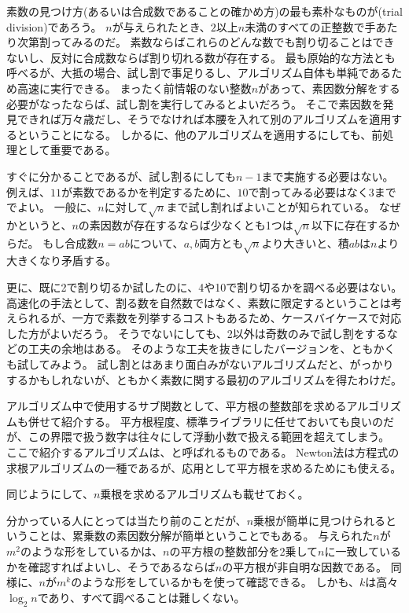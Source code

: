 素数の見つけ方(あるいは合成数であることの確かめ方)の最も素朴なものが(trial division)であろう。
$n$が与えられたとき、$2$以上$n$未満のすべての正整数で手あたり次第割ってみるのだ。
素数ならばこれらのどんな数でも割り切ることはできないし、反対に合成数ならば割り切れる数が存在する。
最も原始的な方法とも呼べるが、大抵の場合、試し割で事足りるし、アルゴリズム自体も単純であるため高速に実行できる。
まったく前情報のない整数$n$があって、素因数分解をする必要がなったならば、試し割を実行してみるとよいだろう。
そこで素因数を発見できれば万々歳だし、そうでなければ本腰を入れて別のアルゴリズムを適用するということになる。
しかるに、他のアルゴリズムを適用するにしても、前処理として重要である。

すぐに分かることであるが、試し割るにしても$n-1$まで実施する必要はない。
例えば、$11$が素数であるかを判定するために、$10$で割ってみる必要はなく$3$まででよい。
一般に、$n$に対して$\sqrt{n}$まで試し割ればよいことが知られている。
なぜかというと、$n$の素因数が存在するならば少なくとも1つは$\sqrt{n}$以下に存在するからだ。
もし合成数$n=ab$について、$a,b$両方とも$\sqrt{n}$より大きいと、積$ab$は$n$より大きくなり矛盾する。

更に、既に2で割り切るか試したのに、4や10で割り切るかを調べる必要はない。
高速化の手法として、割る数を自然数ではなく、素数に限定するということは考えられるが、一方で素数を列挙するコストもあるため、ケースバイケースで対応した方がよいだろう。
そうでないにしても、2以外は奇数のみで試し割をするなどの工夫の余地はある。
そのような工夫を抜きにしたバージョンを、ともかくも試してみよう。
試し割とはあまり面白みがないアルゴリズムだと、がっかりするかもしれないが、ともかく素数に関する最初のアルゴリズムを得たわけだ。


アルゴリズム中で使用するサブ関数として、平方根の整数部を求めるアルゴリズムも併せて紹介する。
平方根程度、標準ライブラリに任せておいても良いのだが、この界隈で扱う数字は往々にして浮動小数で扱える範囲を超えてしまう。
ここで紹介するアルゴリズムは、と呼ばれるものである。
Newton法は方程式の求根アルゴリズムの一種であるが、応用として平方根を求めるためにも使える。


同じようにして、$n$乗根を求めるアルゴリズムも載せておく。


分かっている人にとっては当たり前のことだが、$n$乗根が簡単に見つけられるということは、累乗数の素因数分解が簡単ということでもある。
与えられた$n$が$m^2$のような形をしているかは、$n$の平方根の整数部分を2乗して$n$に一致しているかを確認すればよいし、そうであるならば$n$の平方根が非自明な因数である。
同様に、$n$が$m^k$のような形をしているかもを使って確認できる。
しかも、$k$は高々$\log_2{n}$であり、すべて調べることは難しくない。

